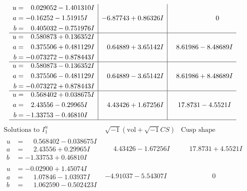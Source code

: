 \documentclass[1p]{elsarticle_modified}
\theoremstyle{definition}
\newcommand{\I}{\sqrt{-1}}
\begin{document}
$$\begin{array}{c|c|c}
\begin{aligned}
u &= \phantom{-}0.029052 - 1.401310 I \\
a &= -0.16252 - 1.51915 I \\
b &= \phantom{-}0.405032 - 0.751976 I\end{aligned}
 & -6.87743 + 0.86326 I & \phantom{-0.000000 } 0 \\ \hline\begin{aligned}
u &= \phantom{-}0.580873 + 0.136352 I \\
a &= \phantom{-}0.375506 + 0.481129 I \\
b &= -0.073272 - 0.878443 I\end{aligned}
 & \phantom{-}0.64889 + 3.65142 I & \phantom{-}8.61986 - 8.48689 I \\ \hline\begin{aligned}
u &= \phantom{-}0.580873 - 0.136352 I \\
a &= \phantom{-}0.375506 - 0.481129 I \\
b &= -0.073272 + 0.878443 I\end{aligned}
 & \phantom{-}0.64889 - 3.65142 I & \phantom{-}8.61986 + 8.48689 I \\ \hline\begin{aligned}
u &= \phantom{-}0.568402 + 0.038675 I \\
a &= \phantom{-}2.43556 - 0.29965 I \\
b &= -1.33753 - 0.46810 I\end{aligned}
 & \phantom{-}4.43426 + 1.67256 I & \phantom{-}17.8731 - 4.5521 I\\
 \hline 
 \end{array}$$\newpage$$\begin{array}{c|c|c}  
\text{Solutions to }I^u_{1}& \I (\text{vol} + \sqrt{-1}CS) & \text{Cusp shape}\\
 \hline 
\begin{aligned}
u &= \phantom{-}0.568402 - 0.038675 I \\
a &= \phantom{-}2.43556 + 0.29965 I \\
b &= -1.33753 + 0.46810 I\end{aligned}
 & \phantom{-}4.43426 - 1.67256 I & \phantom{-}17.8731 + 4.5521 I \\ \hline\begin{aligned}
u &= -0.02900 + 1.45074 I \\
a &= \phantom{-}1.07846 - 1.03937 I \\
b &= \phantom{-}1.062590 - 0.502423 I\end{aligned}
 & -4.91037 - 5.54307 I & \phantom{-0.000000 } 0 \\ \hline\begin{aligned}

\end{aligned}
\end{array}$$
\end{document}
